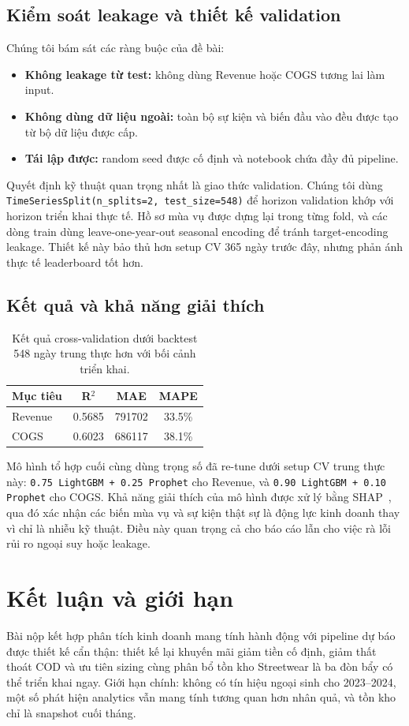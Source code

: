 \documentclass[10pt,twocolumn]{article}
\begin{document}
\subsection{Kiểm soát leakage và thiết kế validation}
Chúng tôi bám sát các ràng buộc của đề bài:
\begin{itemize}
  \item \textbf{Không leakage từ test:} không dùng Revenue hoặc COGS tương lai làm input.
  \item \textbf{Không dùng dữ liệu ngoài:} toàn bộ sự kiện và biến đầu vào đều được tạo từ bộ dữ liệu được cấp.
  \item \textbf{Tái lập được:} random seed được cố định và notebook chứa đầy đủ pipeline.
\end{itemize}

Quyết định kỹ thuật quan trọng nhất là giao thức validation. Chúng tôi dùng \texttt{TimeSeriesSplit(n\_splits=2, test\_size=548)} để horizon validation khớp với horizon triển khai thực tế. Hồ sơ mùa vụ được dựng lại trong từng fold, và các dòng train dùng leave-one-year-out seasonal encoding để tránh target-encoding leakage. Thiết kế này bảo thủ hơn setup CV 365 ngày trước đây, nhưng phản ánh thực tế leaderboard tốt hơn.

\subsection{Kết quả và khả năng giải thích}
\begin{table}[t]
  \centering
  \caption{Kết quả cross-validation dưới backtest 548 ngày trung thực hơn với bối cảnh triển khai.}
  \label{tab:forecast}
  \small
  \begin{tabular}{lccc}
    \toprule
    Mục tiêu & R$^2$ & MAE & MAPE \\
    \midrule
    Revenue & 0.5685 & \num{791702} & 33.5\% \\
    COGS & 0.6023 & \num{686117} & 38.1\% \\
    \bottomrule
  \end{tabular}
\end{table}

Mô hình tổ hợp cuối cùng dùng trọng số đã re-tune dưới setup CV trung thực này: \texttt{0.75 LightGBM + 0.25 Prophet} cho Revenue, và \texttt{0.90 LightGBM + 0.10 Prophet} cho COGS. Khả năng giải thích của mô hình được xử lý bằng SHAP~\citep{lundberg2017unified}, qua đó xác nhận các biến mùa vụ và sự kiện thật sự là động lực kinh doanh thay vì chỉ là nhiễu kỹ thuật. Điều này quan trọng cả cho báo cáo lẫn cho việc rà lỗi rủi ro ngoại suy hoặc leakage.

\section{Kết luận và giới hạn}
Bài nộp kết hợp phân tích kinh doanh mang tính hành động với pipeline dự báo được thiết kế cẩn thận: thiết kế lại khuyến mãi giảm tiền cố định, giảm thất thoát COD và ưu tiên sizing cùng phân bổ tồn kho Streetwear là ba đòn bẩy có thể triển khai ngay. Giới hạn chính: không có tín hiệu ngoại sinh cho 2023--2024, một số phát hiện analytics vẫn mang tính tương quan hơn nhân quả, và tồn kho chỉ là snapshot cuối tháng.



\end{document}
